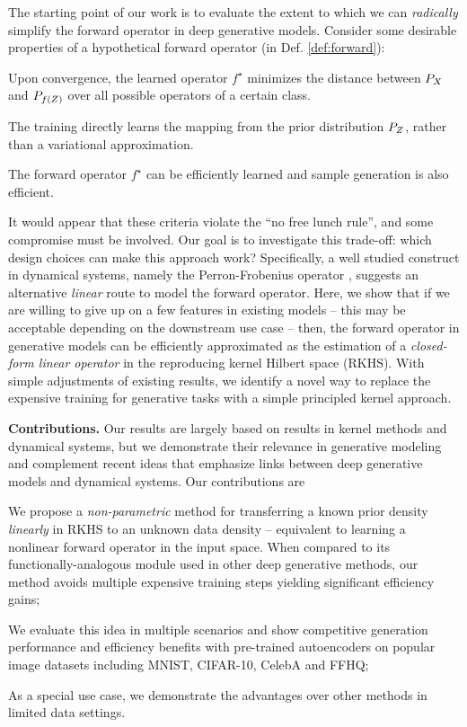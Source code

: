 The starting point of our work is to evaluate the extent to which 
we can {\em radically} simplify the forward operator in deep generative models. Consider some desirable properties of a hypothetical forward operator (in Def. \eqref{def:forward}): \begin{inparaenum}[\bfseries (a)]\item Upon  convergence, the learned operator $f^\star$ minimizes the distance between $P_{\var{x}}$ and $P_{f(\var{z})}$ over all possible operators of a certain class. \item The training directly learns the mapping from the prior distribution $P_{\var{Z}}$, rather than a variational approximation. \item The forward operator $f^\star$ can be efficiently learned and sample generation is also efficient.  
\end{inparaenum} 
It would appear that 
these criteria violate the ``no free lunch rule'', and 
some compromise must be involved. Our goal is 
to investigate this trade-off: 
which design 
choices can make 
this approach work? 
Specifically, a well studied construct in dynamical systems, namely the Perron-Frobenius operator \citep{lemmens2012nonlinear}, suggests an alternative \textit{linear} route to model the forward operator. Here, 
we show that 
if we are willing to give up on a few features  
in existing models -- this may be acceptable depending on the downstream use case --  
then, the forward operator in generative models can be efficiently approximated as the estimation of a {\it closed-form linear operator} in the reproducing kernel Hilbert space (RKHS). With simple adjustments of existing results, we identify a novel way to replace the expensive training for generative tasks with a simple principled kernel approach.

\textbf{Contributions.} Our results are largely based on results in kernel methods and dynamical systems, but we demonstrate their relevance in generative modeling and complement recent ideas that emphasize links between deep generative models and dynamical systems. Our contributions are 
\begin{inparaenum}[\bfseries (a)] \item We propose a \textit{non-parametric} method for transferring a known prior density {\it linearly} in RKHS to an unknown data density -- equivalent to learning a nonlinear forward operator in the input space. When compared to its functionally-analogous module used in other deep generative methods, our method 
avoids multiple expensive training steps yielding significant efficiency gains; \item We evaluate this idea in multiple scenarios and show competitive generation performance and efficiency benefits with pre-trained autoencoders on popular image datasets including MNIST, CIFAR-10, CelebA and FFHQ; \item As a special use case, we demonstrate the advantages over other methods in limited data settings. 
\end{inparaenum}
